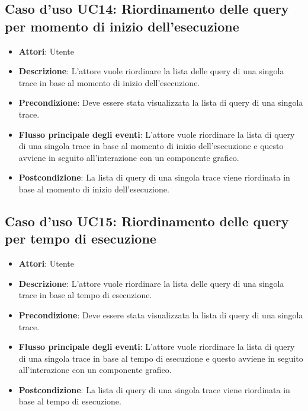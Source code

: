 \subsection{Caso d'uso UC14: Riordinamento delle query per momento di inizio dell'esecuzione}
\begin{itemize}
	\item \textbf{Attori}: Utente
	\item \textbf{Descrizione}: L'attore vuole riordinare la lista delle query di una singola trace in base al momento di inizio dell'esecuzione.
	\item \textbf{Precondizione}: Deve essere stata visualizzata la lista di query di una singola trace.
	\item \textbf{Flusso principale degli eventi}: L'attore vuole riordinare la lista di query di una singola trace in base al momento di inizio dell'esecuzione e questo avviene in seguito all'interazione con un componente grafico.
	\item \textbf{Postcondizione}: La lista di query di una singola trace viene riordinata in base al momento di inizio dell'esecuzione.
\end{itemize}
\subsection{Caso d'uso UC15: Riordinamento delle query per tempo di esecuzione}
\begin{itemize}
	\item \textbf{Attori}: Utente
	\item \textbf{Descrizione}: L'attore vuole riordinare la lista delle query di una singola trace in base al tempo di esecuzione.
	\item \textbf{Precondizione}: Deve essere stata visualizzata la lista di query di una singola trace.
	
	\item \textbf{Flusso principale degli eventi}: L'attore vuole riordinare la lista di query di una singola trace in base al tempo di esecuzione e questo avviene in seguito all'interazione con un componente grafico.
	\item \textbf{Postcondizione}: La lista di query di una singola trace viene riordinata in base al tempo di esecuzione.
\end{itemize}
